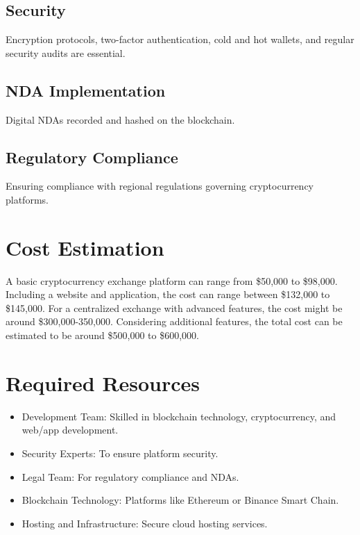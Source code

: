 \documentclass{article}
\begin{document}
	\subsection{Security}
	Encryption protocols, two-factor authentication, cold and hot wallets, and regular security audits are essential.
	
	\subsection{NDA Implementation}
	Digital NDAs recorded and hashed on the blockchain.
	
	\subsection{Regulatory Compliance}
	Ensuring compliance with regional regulations governing cryptocurrency platforms.
	
	\section{Cost Estimation}
	A basic cryptocurrency exchange platform can range from \$50,000 to \$98,000. Including a website and application, the cost can range between \$132,000 to \$145,000. For a centralized exchange with advanced features, the cost might be around \$300,000-350,000. Considering additional features, the total cost can be estimated to be around \$500,000 to \$600,000.
	
	\section{Required Resources}
	\begin{itemize}
		\item Development Team: Skilled in blockchain technology, cryptocurrency, and web/app development.
		\item Security Experts: To ensure platform security.
		\item Legal Team: For regulatory compliance and NDAs.
		\item Blockchain Technology: Platforms like Ethereum or Binance Smart Chain.
		\item Hosting and Infrastructure: Secure cloud hosting services.
	\end{itemize}
		
\end{document}
